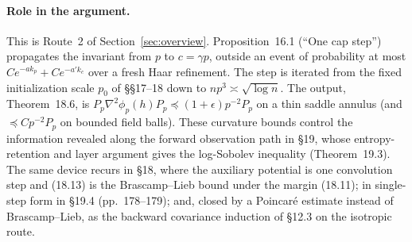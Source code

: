 \documentclass[11pt]{article}
\newcommand{\ploc}[2]{#1}
\begin{document}
\paragraph{Role in the argument.}
This is Route~2 of Section~\ref{sec:overview}.
\ploc{Proposition~16.1}{cap-multiscale.tex:80--119} (``One cap step'')
propagates the invariant from $p$ to $c=\gamma p$, outside an event of
probability at most $Ce^{-ak_p}+Ce^{-a'k_c}$ over a fresh Haar refinement. The
step is iterated from the fixed initialization scale $p_0$ of \S\S17--18
down to $np^3\asymp\sqrt{\log n}$. The output,
\ploc{Theorem~18.6}{cap-initialization.tex:975--999}, is
$P_p\nabla^2\phi_p(h)P_p\preceq(1+\epsilon)p^{-2}P_p$ on a thin saddle annulus
(and $\preceq Cp^{-2}P_p$ on bounded field balls). These curvature bounds
control the information revealed along the forward observation path in
\ploc{\S19}{cap-entropy.tex:3--8, 427}, whose entropy-retention and layer
argument gives the log-Sobolev inequality
\ploc{(Theorem~19.3)}{cap-entropy.tex:856}. The same device recurs in \S18,
where the auxiliary potential is one convolution step and
\ploc{(18.13)}{cap-initialization.tex:518--525} is the Brascamp--Lieb bound
under the margin \ploc{(18.11)}{cap-initialization.tex:402--409}; in
single-step form in \ploc{\S19.4 (pp.~178--179)}{cap-entropy.tex:551--557}; and, closed by
a Poincar\'e estimate instead of Brascamp--Lieb, as the backward covariance
induction of \ploc{\S12.3}{profile-amplification.tex:633--645, 908--921} on
the isotropic route.
\end{document}
